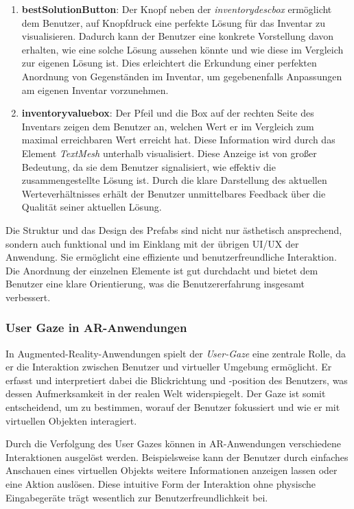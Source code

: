 \begin{itemize}
\begin{enumerate}
    \item \textbf{bestSolutionButton}: Der Knopf neben der \textit{inventorydescbox} ermöglicht dem Benutzer, auf Knopfdruck
    eine perfekte Lösung für das Inventar zu visualisieren. Dadurch kann der Benutzer eine konkrete Vorstellung davon erhalten,
    wie eine solche Lösung aussehen könnte und wie diese im Vergleich zur eigenen Lösung ist. Dies erleichtert die Erkundung
    einer perfekten Anordnung von Gegenständen im Inventar, um gegebenenfalls Anpassungen am eigenen Inventar vorzunehmen.

    \item \textbf{inventoryvaluebox}: Der Pfeil und die Box auf der rechten Seite des Inventars zeigen dem Benutzer an, welchen
    Wert er im Vergleich zum maximal erreichbaren Wert erreicht hat. Diese Information wird durch das Element \textit{TextMesh}
    unterhalb visualisiert. Diese Anzeige ist von großer Bedeutung, da sie dem Benutzer signalisiert, wie effektiv die
    zusammengestellte Lösung ist. Durch die klare Darstellung des aktuellen Werteverhältnisses erhält der Benutzer unmittelbares
    Feedback über die Qualität seiner aktuellen Lösung.
\end{enumerate}

Die Struktur und das Design des Prefabs sind nicht nur ästhetisch ansprechend, sondern auch funktional und im Einklang
mit der übrigen UI/UX der Anwendung. Sie ermöglicht eine effiziente und benutzerfreundliche Interaktion. Die Anordnung
der einzelnen Elemente ist gut durchdacht und bietet dem Benutzer eine klare Orientierung, was die Benutzererfahrung
insgesamt verbessert.

\subsubsection{User Gaze in AR-Anwendungen}
In Augmented-Reality-Anwendungen spielt der \textit{User-Gaze} eine zentrale Rolle, da er die Interaktion zwischen Benutzer
und virtueller Umgebung ermöglicht. Er erfasst und interpretiert dabei die Blickrichtung und -position des Benutzers,
was dessen Aufmerksamkeit in der realen Welt widerspiegelt. Der Gaze ist somit entscheidend, um zu bestimmen, worauf der
Benutzer fokussiert und wie er mit virtuellen Objekten interagiert.

Durch die Verfolgung des User Gazes können in AR-Anwendungen verschiedene Interaktionen ausgelöst werden. Beispielsweise
kann der Benutzer durch einfaches Anschauen eines virtuellen Objekts weitere Informationen anzeigen lassen oder eine
Aktion auslösen. Diese intuitive Form der Interaktion ohne physische Eingabegeräte trägt wesentlich zur Benutzerfreundlichkeit
bei.


\end{itemize}
